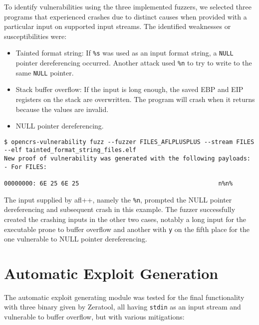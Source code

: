 \documentclass[../main.tex]{subfiles}
\begin{document}
To identify vulnerabilities using the three implemented fuzzers, we selected
three programs that experienced crashes due to distinct causes when provided
with a particular input on supported input streams. The identified weaknesses
or susceptibilities were:

\begin{itemize}
  \tightlist
  \item
        Tainted format string: If \texttt{\%s} was used as an input format
        string, a \texttt{NULL} pointer dereferencing occurred. Another attack
        used \texttt{\%n} to try to write to the same \texttt{NULL} pointer.
  \item
        Stack buffer overflow: If the input is long enough, the saved EBP and
        EIP registers on the stack are overwritten. The program will crash
        when it returns because the values are invalid.
  \item
        NULL pointer dereferencing.
\end{itemize}

\begin{tiny}
\begin{verbatim}
$ opencrs-vulnerability fuzz --fuzzer FILES_AFLPLUSPLUS --stream FILES --elf tainted_format_string_files.elf
New proof of vulnerability was generated with the following payloads:
- For FILES:

00000000: 6E 25 6E 25                                       n%n%
\end{verbatim}
\end{tiny}

The input supplied by afl++, namely the \texttt{\%n}, prompted the NULL pointer
dereferencing and subsequent crash in this example. The fuzzer successfully
created the crashing inputs in the other two cases, notably a long input for
the executable prone to buffer overflow and another with \texttt{y} on the
fifth place for the one vulnerable to NULL pointer dereferencing.

\hypertarget{automatic-exploit-generation}{%
  \section{Automatic Exploit
    Generation}\label{automatic-exploit-generation}}

The automatic exploit generating module was tested for the final functionality
with three binary given by Zeratool, all having \texttt{stdin} as an input
stream and vulnerable to buffer overflow, but with various mitigations:
\end{document}
